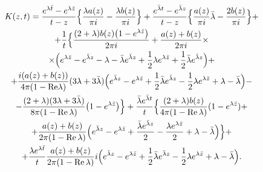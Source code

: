 \begin{multline*}

K(z,t) = \frac{e^{\lambda \bar t}  - e^{\lambda \bar z} }{t - z}   

\Bigl\{ \frac{\lambda a(z)}{\pi i} - \frac{\lambda b(z)}{\pi i} \Bigr\} + 

\frac{e^{\bar \lambda t}  - e^{\bar \lambda z}}{t - z}   

\Bigl\{ \frac{a(z)}{\pi i}\bar \lambda  - \frac{2b(z)}{\pi i} \Bigr\} +\\

+ \frac{1}{t}   \Bigl\{ \frac{(2 + \lambda )b(z)   \bigl(1 - e^{\lambda \bar z} \bigr)}{2\pi i} +

\frac{a(z) + b(z)}{2\pi i} \times \\

\times \Bigl( e^{\lambda \bar z}  - e^{\bar \lambda z}  - \lambda  - \bar \lambda e^{\bar \lambda z}  + \frac{1}{2}\lambda e^{\lambda \bar z}  + \frac{1}{2}\bar \lambda e^{\bar \lambda z}  \Bigr) + 

\\

+ \frac{i(a(z) + b(z))}{4\pi (1 - {\rm Re} \lambda )}   (3\lambda  + 3\bar \lambda )   \Bigl(e^{\bar \lambda z}  - e^{\lambda \bar z}  + \frac{1}{2}\bar \lambda e^{\bar \lambda z}  - \frac{1}{2}\lambda e^{\lambda \bar z}  + \lambda  - \bar \lambda \Bigr) -

\\

-\frac{(2 + \lambda )   (3\lambda  + 3\bar \lambda )}{8\pi (1 - \mathop{\rm Re} \lambda )}

\bigl(1 - e^{\lambda \bar z} \bigr) \Bigr\} + 

\frac{\bar \lambda e^{\bar \lambda t} }{t}\Bigl\{ \frac{(2 + \lambda )   b(z)}{4\pi (1 - \mathop{\rm Re} \lambda )} (1 - e^{\lambda \bar z} ) + \\

+ \frac{a(z) + b(z)}{2\pi (1 - \mathop{\rm Re} \lambda )}  

\Bigl( e^{\bar \lambda z}  - e^{\lambda \bar z}  + \frac{\bar \lambda e^{\bar \lambda z} }{2} - \frac{\lambda e^{\lambda \bar z} }{2} + \lambda  - \bar \lambda \Bigr) \Bigr\} +

\\

+

 \frac{\lambda e^{\lambda \bar t} }{t}   \frac{a(z) + b(z)}{2\pi (1 - \mathop{\rm Re}\lambda )}i 

 \Bigl( e^{\bar \lambda z}  - e^{\lambda \bar z}  + \frac{1}{2}\bar \lambda e^{\bar \lambda z}  - \frac{1}{2}\lambda e^{\lambda \bar z}  + \lambda  - \bar \lambda \Bigr).

\end{multline*}



